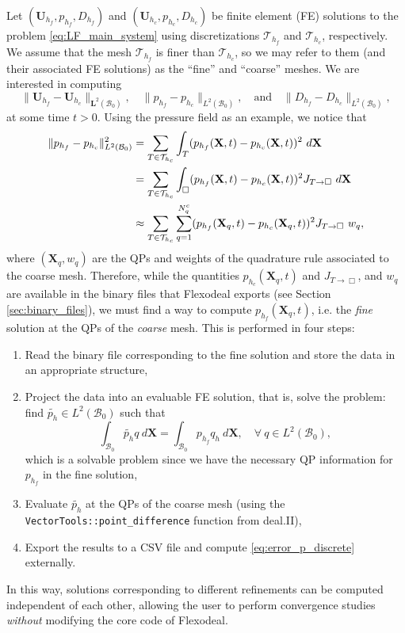 \documentclass{sfuthesis}
\numberwithin{equation}{section}
\numberwithin{figure}{chapter}
\numberwithin{table}{chapter}
\theoremstyle{definition}
\def\*#1{{\mathbf{#1}}} %
\newcommand{\B}{\mathcal{B}}
\begin{document}
Let $(\*U_{h_f}, p_{h_f}, D_{h_f})$ and $\left(\*U_{h_c}, p_{h_c}, D_{h_c}\right)$ be finite element (FE) solutions to the problem \eqref{eq:LF_main_system} using discretizations $\mathcal{T}_{h_f}$ and $\mathcal{T}_{h_c}$, respectively. We assume that the mesh $\mathcal{T}_{h_f}$ is finer than $\mathcal{T}_{h_c}$, so we may refer to them (and their associated FE solutions) as the ``fine'' and ``coarse'' meshes. We are interested in computing
\[
  \| \*U_{h_f} - \*U_{h_c} \|_{\*L^2(\B_0)}, \quad \| p_{h_f} - p_{h_c} \|_{L^2(\B_0)}, \quad \text{and} \quad  \| D_{h_f} - D_{h_c} \|_{L^2(\B_0)},
\]
at some time $t > 0$. Using the pressure field as an example, we notice that
\begin{align}
    \| p_{h_f} - p_{h_c} \|_{L^2(\B_0)}^2 &= \displaystyle \sum_{T \in \mathcal{T}_{h_c}} \int_{T} (p_{h_f}(\*X, t) - p_{h_c}(\*X, t))^2 \ d\*X \notag \\
    &= \displaystyle \sum_{T \in \mathcal{T}_{h_c}} \int_{\Box} (p_{h_f}(\*X, t) - p_{h_c}(\*X, t))^2 J_{T \to \Box} \ d\*X \notag \\
    &\approx \displaystyle \sum_{T \in \mathcal{T}_{h_c}} \sum_{q=1}^{N_q^c} (p_{h_f}(\*X_q, t) - p_{h_c}(\*X_q, t))^2 J_{T \to \Box} \ w_q, \label{eq:error_p_discrete}
\end{align}
where $(\*X_q, w_q)$ are the QPs and weights of the quadrature rule associated to the coarse mesh. Therefore, while the quantities $p_{h_c}(\*X_q,t)$ and $J_{T \to \Box}$, and $w_q$ are available in the binary files that Flexodeal exports (see Section \ref{sec:binary_files}), we must find a way to compute $p_{h_f}(\*X_q,t)$, i.e. the \textit{fine} solution at the QPs of the \textit{coarse} mesh. This is performed in four steps:
\begin{enumerate}
    \item Read the binary file corresponding to the fine solution and store the data in an appropriate structure,
    \item Project the data into an evaluable FE solution, that is, solve the problem: find $\widetilde{p_h} \in L^2(\B_0)$ such that
    \[
    \int_{\B_0} \widetilde{p_h} q  \ d\*X = \int_{\B_0} p_{h_f} q_h \ d\*X, \quad \forall \ q \in L^2(\B_0),
    \]
    which is a solvable problem since we have the necessary QP information for $p_{h_f}$ in the fine solution,
    \item Evaluate $\widetilde{p_h}$ at the QPs of the coarse mesh (using the \texttt{VectorTools::point\_difference} function from deal.II),
    \item Export the results to a CSV file and compute \eqref{eq:error_p_discrete} externally.
\end{enumerate}
In this way, solutions corresponding to different refinements can be computed independent of each other, allowing the user to perform convergence studies \textit{without} modifying the core code of Flexodeal.
\end{document}
